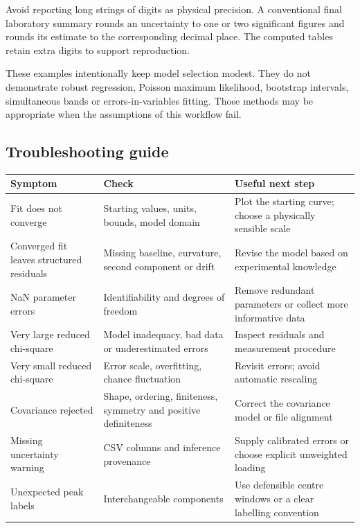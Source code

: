 \documentclass[
  british,
  10pt,
  a4paper,
]{article}
\begin{document}
Avoid reporting long strings of digits as physical precision. A
conventional final laboratory summary rounds an uncertainty to one or
two significant figures and rounds its estimate to the corresponding
decimal place. The computed tables retain extra digits to support
reproduction.

These examples intentionally keep model selection modest. They do not
demonstrate robust regression, Poisson maximum likelihood, bootstrap
intervals, simultaneous bands or errors-in-variables fitting. Those
methods may be appropriate when the assumptions of this workflow fail.


\subsection{Troubleshooting guide}\label{troubleshooting-guide}

\begin{longtable}[]{@{}
  >{\raggedright\arraybackslash}p{}
  >{\raggedright\arraybackslash}p{}
  >{\raggedright\arraybackslash}p{}@{}}
\toprule\noalign{}
\begin{minipage}[b]{\linewidth}\raggedright
Symptom
\end{minipage} & \begin{minipage}[b]{\linewidth}\raggedright
Check
\end{minipage} & \begin{minipage}[b]{\linewidth}\raggedright
Useful next step
\end{minipage} \\
\midrule\noalign{}
\endhead
\bottomrule\noalign{}
\endlastfoot
Fit does not converge & Starting values, units, bounds, model domain &
Plot the starting curve; choose a physically sensible scale \\
Converged fit leaves structured residuals & Missing baseline, curvature,
second component or drift & Revise the model based on experimental
knowledge \\
NaN parameter errors & Identifiability and degrees of freedom & Remove
redundant parameters or collect more informative data \\
Very large reduced chi-square & Model inadequacy, bad data or
underestimated errors & Inspect residuals and measurement procedure \\
Very small reduced chi-square & Error scale, overfitting, chance
fluctuation & Revisit errors; avoid automatic rescaling \\
Covariance rejected & Shape, ordering, finiteness, symmetry and positive
definiteness & Correct the covariance model or file alignment \\
Missing uncertainty warning & CSV columns and inference provenance &
Supply calibrated errors or choose explicit unweighted loading \\
Unexpected peak labels & Interchangeable components & Use defensible
centre windows or a clear labelling convention \\
\end{longtable}
\end{document}
